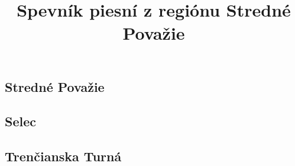 \documentclass[a4paper]{book}
\title{Spevník piesní z regiónu Stredné Považie}
\begin{document}
\maketitle
\begin{center}

\chapter*{Stredné Považie}
\section*{Selec}
{%
\parindent 0pt
\noindent
\ifx\preLilyPondExample \undefined
\else
  \expandafter\preLilyPondExample
\fi
\def\lilypondbook{}%

\ifx\postLilyPondExample \undefined
\else
  \expandafter\postLilyPondExample
\fi
}
{%
\parindent 0pt
\noindent
\ifx\preLilyPondExample \undefined
\else
  \expandafter\preLilyPondExample
\fi
\def\lilypondbook{}%

\ifx\postLilyPondExample \undefined
\else
  \expandafter\postLilyPondExample
\fi
}
{%
\parindent 0pt
\noindent
\ifx\preLilyPondExample \undefined
\else
  \expandafter\preLilyPondExample
\fi
\def\lilypondbook{}%

\ifx\postLilyPondExample \undefined
\else
  \expandafter\postLilyPondExample
\fi
}
{%
\parindent 0pt
\noindent
\ifx\preLilyPondExample \undefined
\else
  \expandafter\preLilyPondExample
\fi
\def\lilypondbook{}%

\ifx\postLilyPondExample \undefined
\else
  \expandafter\postLilyPondExample
\fi
}
{%
\parindent 0pt
\noindent
\ifx\preLilyPondExample \undefined
\else
  \expandafter\preLilyPondExample
\fi
\def\lilypondbook{}%

\ifx\postLilyPondExample \undefined
\else
  \expandafter\postLilyPondExample
\fi
}


\section*{Trenčianska Turná}
{%
\parindent 0pt
\noindent
\ifx\preLilyPondExample \undefined
\else
  \expandafter\preLilyPondExample
\fi
\def\lilypondbook{}%

\ifx\postLilyPondExample \undefined
\else
  \expandafter\postLilyPondExample
\fi
}
{%
\parindent 0pt
\noindent
\ifx\preLilyPondExample \undefined
\else
  \expandafter\preLilyPondExample
\fi
\def\lilypondbook{}%

\ifx\postLilyPondExample \undefined
\else
  \expandafter\postLilyPondExample
\fi
}
{%
\parindent 0pt
\noindent
\ifx\preLilyPondExample \undefined
\else
  \expandafter\preLilyPondExample
\fi
\def\lilypondbook{}%

\ifx\postLilyPondExample \undefined
\else
  \expandafter\postLilyPondExample
\fi
}


\end{center}
\end{document}
